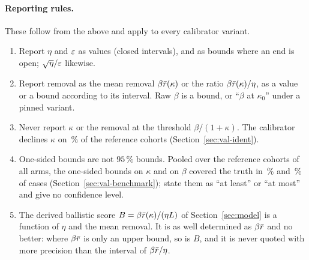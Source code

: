 \paragraph{Reporting rules.} These follow from the above and apply to every calibrator variant.
\begin{enumerate}[leftmargin=1.5em,itemsep=1pt]
  \item Report $\eta$ and $\varepsilon$ as values (closed intervals), and as bounds where an end is open; $\sqrt\eta/\varepsilon$ likewise.
  \item Report removal as the mean removal $\beta\bar r(\kappa)$ or the ratio $\beta\bar r(\kappa)/\eta$, as a value or a bound
    according to its interval. Raw $\beta$ is a bound, or ``$\beta$ at $\kappa_0$'' under a pinned variant.
  \item Never report $\kappa$ or the removal at the threshold $\beta/(1+\kappa)$. The calibrator declines $\kappa$ on
    \,\% of the  reference cohorts (Section~\ref{sec:val-ident}).
  \item One-sided bounds are not $95\,\%$ bounds. Pooled over the reference cohorts of all arms, the one-sided
    bounds on $\kappa$ and on $\beta$ covered the truth in \,\% and \,\%
    of cases (Section~\ref{sec:val-benchmark}); state them as ``at least'' or ``at most'' and give no confidence level.
  \item The derived ballistic score $B=\beta\bar r(\kappa)/(\eta L)$ of Section~\ref{sec:model} is a function of $\eta$ and the mean
    removal. It is as well determined as $\beta\bar r$ and no better: where $\beta\bar r$ is only an upper bound, so is $B$, and it is
    never quoted with more precision than the interval of $\beta\bar r/\eta$.
\end{enumerate}

